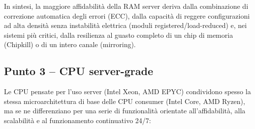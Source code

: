\documentclass[11pt,a4paper]{article}
\begin{document}
In sintesi, la maggiore affidabilità della RAM server deriva dalla combinazione di correzione automatica degli errori (ECC), dalla capacità di reggere configurazioni ad alta densità senza instabilità elettrica (moduli registered/load-reduced) e, nei sistemi più critici, dalla resilienza al guasto completo di un chip di memoria (Chipkill) o di un intero canale (mirroring).

\subsection{Punto 3 -- CPU server-grade}

Le CPU pensate per l'uso server (Intel Xeon, AMD EPYC) condividono spesso la stessa microarchitettura di base delle CPU consumer (Intel Core, AMD Ryzen), ma se ne differenziano per una serie di funzionalità orientate all'affidabilità, alla scalabilità e al funzionamento continuativo 24/7:
\end{document}
